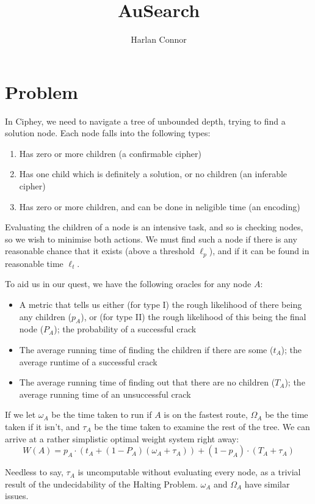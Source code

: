 \documentclass{article}
\title{AuSearch}
\author{Harlan Connor}
\theoremstyle{definition}
\begin{document}
\maketitle
\pagebreak

\section{Problem}
In Ciphey, we need to navigate a tree of unbounded depth, trying to find a 
solution node. Each node falls into the following types:
\begin{enumerate}[label=\Roman*]
\item Has zero or more children (a confirmable cipher)
\item Has one child which is definitely a solution, or no children (an inferable cipher)
\item  Has zero or more children, and can be done in neligible time (an encoding)
\end{enumerate}

Evaluating the children of a node is an intensive task, and so is checking nodes,
so we wish to minimise both actions. We must find such a node if there is any 
reasonable chance that it exists (above a threshold $\ell_p$), and if it can be 
found in reasonable time $\ell_t$.

To aid us in our quest, we have the following oracles for any node $A$:
\begin{itemize}
\item A metric that tells us either (for type I) the rough likelihood of there being any children ($p_A$), or (for type II) the rough likelihood of this being the final node ($P_A$); 
      the probability of a successful crack
\item The average running time of finding the children if there are some ($t_A$);
      the average runtime of a successful crack
\item The average running time of finding out that there are no children ($T_A$);
      the average running time of an unsuccessful crack
\end{itemize}

If we let $\omega_A$ be the time taken to run if $A$ is on the fastest route,
$\Omega_A$ be the time taken if it isn't, and $\tau_A$ be the time taken to examine the rest of the tree.
We can arrive at a rather simplistic optimal weight system right away:
\[
	W(A) = p_A \cdot (t_A + (1-P_A) (\omega_A + \tau_A)) + (1 - p_A) \cdot (T_A + \tau_A)
\]

Needless to say, $\tau_A$ is uncomputable without evaluating every node, as a
trivial result of the undecidability of the Halting Problem. $\omega_A$ and $\Omega_A$ have similar issues.
\end{document}
